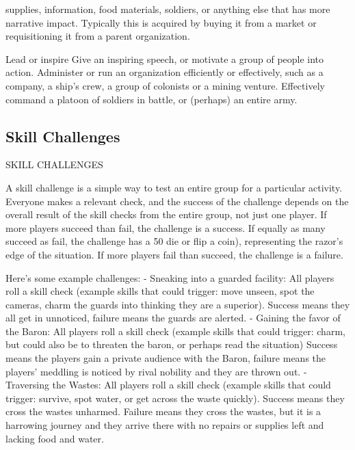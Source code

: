 supplies, information, food materials, soldiers, or anything else that has more narrative impact.  
Typically this is acquired by buying it from a market or requisitioning it from a parent organization.  

Lead or inspire  
Give an inspiring speech, or motivate a group of people into action. Administer or run an  
organization efficiently or effectively, such as a company, a ship’s crew, a group of colonists or a  
mining venture. Effectively command a platoon of soldiers in battle, or (perhaps) an entire army.  

\subsection{Skill Challenges}
                                         SKILL CHALLENGES  

A skill challenge is a simple way to test an entire group for a particular activity. Everyone makes a  
relevant check, and the success of the challenge depends on the overall result of the skill checks  
from the entire group, not just one player. If more players succeed than fail, the challenge is a  
success. If equally as many succeed as fail, the challenge has a 50%
die or flip a coin), representing the razor’s edge of the situation. If more players fail than succeed,  
the challenge is a failure.  

Here’s some example challenges:  
    -    Sneaking into a guarded facility: All players roll a skill check (example skills that could  
         trigger: move unseen, spot the cameras, charm the guards into thinking they are a  
         superior). Success means they all get in unnoticed, failure means the guards are alerted.  
    -    Gaining the favor of the Baron: All players roll a skill check (example skills that could  
         trigger: charm, but could also be to threaten the baron, or perhaps read the situation)  
         Success means the players gain a private audience with the Baron, failure means the  
         players’ meddling is noticed by rival nobility and they are thrown out.  
    -    Traversing the Wastes: All players roll a skill check (example skills that could trigger:  
         survive, spot water, or get across the waste quickly). Success means they cross the  
         wastes unharmed. Failure means they cross the wastes, but it is a harrowing journey and  
         they arrive there with no repairs or supplies left and lacking food and water.  

